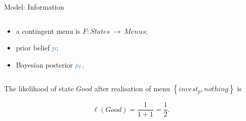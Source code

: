 \documentclass[usenames,dvipsnames,aspectratio=169,11pt]{beamer}
\begin{document}
\begin{frame}[noframenumbering]{Model: Information}
\begin{columns}
		\begin{column}{0.45\textwidth} %
			\begin{itemize}
				\item a contingent menu is \(F: States \: \rightarrow \: Menus \);
				\item prior belief \( \textcolor{RoyalBlue}{p} \);
				\item Bayesian posterior \( \textcolor{RoyalBlue}{p_{\ell}} \).
			\end{itemize}
		\end{column}
	\end{columns}

	\vspace{0.6cm}

	The likelihood of state \(Good\) after realisation of menu \( \left\{invest_{\overline{p}}, nothing \right\} \) is

	\vfill

	\[ \ell \left( Good \right) = \frac{1}{1+1} = \frac{1}{2} .
	\]
\end{frame}
\end{document}
